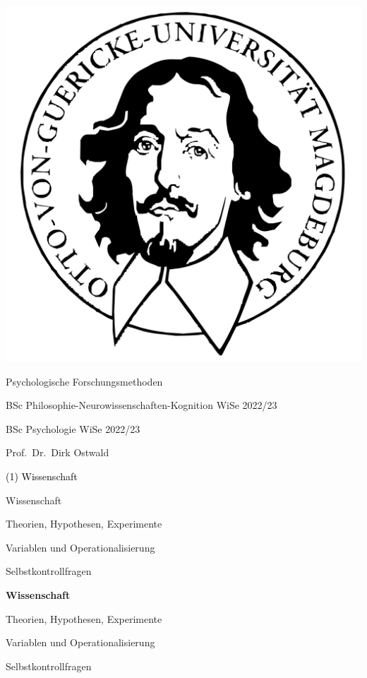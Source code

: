 \documentclass[
  8pt,
  ignorenonframetext,
]{beamer}
\author{}
\date{\vspace{-2.5em}}
\begin{document}
\begin{frame}[plain]{}
\protect\hypertarget{section}{}
\center

\begin{center}\includegraphics[width=0.2\linewidth]{1_Abbildungen/pfm_1_otto} \end{center}

\vspace{2mm}

\Large

Psychologische Forschungsmethoden \vspace{6mm}

\normalsize

BSc Philosophie-Neurowissenschaften-Kognition WiSe 2022/23

BSc Psychologie WiSe 2022/23

\large
\vspace{6mm}

Prof.~Dr.~Dirk Ostwald
\end{frame}

\begin{frame}[plain]{}
\protect\hypertarget{section-1}{}
\vfill
\center
\huge

\textcolor{black}{(1) Wissenschaft} \vfill
\end{frame}

\begin{frame}{}
\protect\hypertarget{section-2}{}
\vfill
{}
\Large

Wissenschaft

Theorien, Hypothesen, Experimente

Variablen und Operationalisierung

Selbstkontrollfragen
\end{frame}

\begin{frame}{}
\protect\hypertarget{section-3}{}
\vfill
{}
\Large

\textbf{Wissenschaft}

Theorien, Hypothesen, Experimente

Variablen und Operationalisierung

Selbstkontrollfragen
\end{frame}
\end{document}
